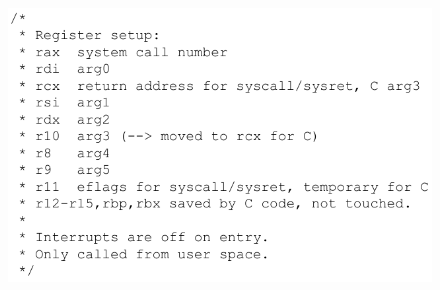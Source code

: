 \documentclass[12pt, oneside]{extbook}
\begin{document}
\begin{figure}[!h]
	\includegraphics[scale=0.3]{immagini/conv_unistd64.png}
\end{figure}
\end{document}
